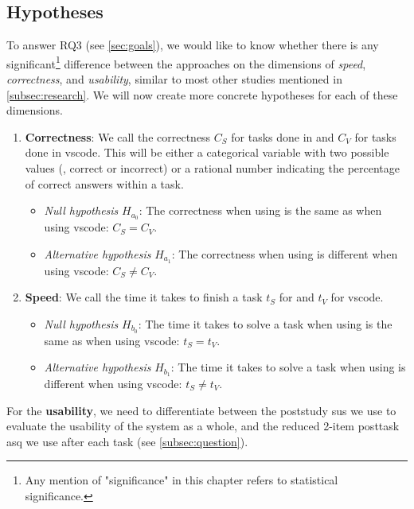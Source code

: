 \documentclass[../thesis]{subfiles}
\begin{document}
\subsection{Hypotheses}\label{subsec:hypotheses}

To answer \textsf{RQ3} (see \cref{sec:goals}), we would like to know whether there is any significant\footnote{
	Any mention of "significance" in this chapter refers to statistical significance.
} difference between the approaches on the dimensions of \emph{speed}, \emph{correctness}, and \emph{usability}, similar to most other studies mentioned in \cref{subsec:research}.
We will now create more concrete hypotheses for each of these dimensions.

\begin{enumerate}[label=\alph*)]
	\item \textbf{Correctness}: We call the correctness $C_S$ for tasks done in \SEE{} and $C_V$ for tasks done in \gls{vscode}.
	      This will be either a categorical variable with two possible values (\ie, correct or incorrect) or a rational number indicating the percentage of correct answers within a task.
	      \begin{itemize}
		      \item \emph{Null hypothesis} $H_{a_0}$:
		            The correctness when using \SEE{} is the same as when using \gls{vscode}: $C_S = C_V$.
		      \item \emph{Alternative hypothesis} $H_{a_1}$:
		            The correctness when using \SEE{} is different when using \gls{vscode}: $C_S \neq C_V$.
	      \end{itemize}
	\item \textbf{Speed}: We call the time it takes to finish a task $t_S$ for \SEE{} and $t_V$ for \gls{vscode}.
	      \begin{itemize}
		      \item \emph{Null hypothesis} $H_{b_0}$:
		            The time it takes to solve a task when using \SEE{} is the same as when using \gls{vscode}: $t_S = t_V$.
		      \item \emph{Alternative hypothesis} $H_{b_1}$:
		            The time it takes to solve a task when using \SEE{} is different when using \gls{vscode}: $t_S \neq t_V$.
	      \end{itemize}
\end{enumerate}

For the \textbf{usability}, we need to differentiate between the \gls{poststudy} \gls{sus} we use to evaluate the usability of the system as a whole, and the reduced 2-item \gls{posttask} \gls{asq} we use after each task (see \cref{subsec:question}).
\end{document}
